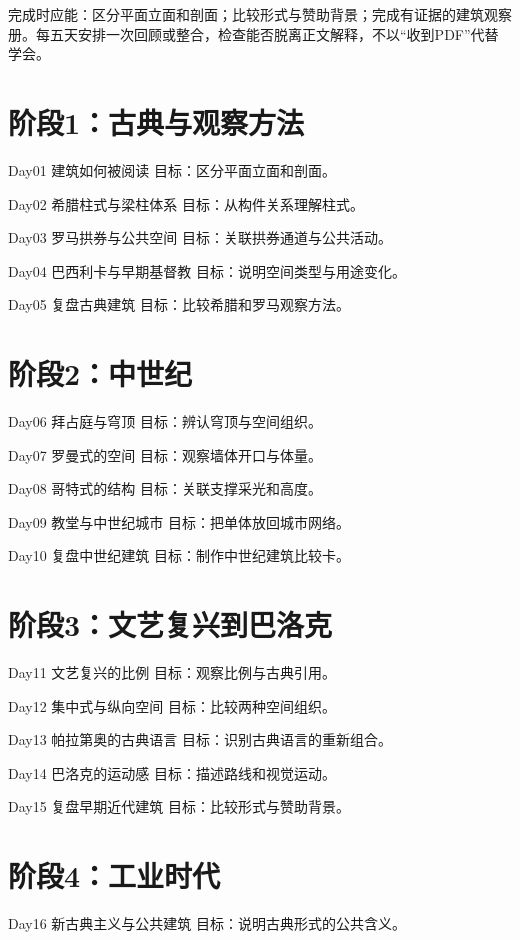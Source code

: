 \documentclass[11pt]{article}
\newcommand{\Needspace}[1]{\par\ifdim\dimexpr\pagegoal-\pagetotal\relax<#1\relax\newpage\fi}
\begin{document}
完成时应能：区分平面立面和剖面；比较形式与赞助背景；完成有证据的建筑观察册。每五天安排一次回顾或整合，检查能否脱离正文解释，不以“收到PDF”代替学会。

\Needspace{5\baselineskip}\section*{阶段1：古典与观察方法}

Day01  建筑如何被阅读
目标：区分平面立面和剖面。

Day02  希腊柱式与梁柱体系
目标：从构件关系理解柱式。

Day03  罗马拱券与公共空间
目标：关联拱券通道与公共活动。

Day04  巴西利卡与早期基督教
目标：说明空间类型与用途变化。

Day05  复盘古典建筑
目标：比较希腊和罗马观察方法。

\Needspace{5\baselineskip}\section*{阶段2：中世纪}

Day06  拜占庭与穹顶
目标：辨认穹顶与空间组织。

Day07  罗曼式的空间
目标：观察墙体开口与体量。

Day08  哥特式的结构
目标：关联支撑采光和高度。

Day09  教堂与中世纪城市
目标：把单体放回城市网络。

Day10  复盘中世纪建筑
目标：制作中世纪建筑比较卡。

\Needspace{5\baselineskip}\section*{阶段3：文艺复兴到巴洛克}

Day11  文艺复兴的比例
目标：观察比例与古典引用。

Day12  集中式与纵向空间
目标：比较两种空间组织。

Day13  帕拉第奥的古典语言
目标：识别古典语言的重新组合。

Day14  巴洛克的运动感
目标：描述路线和视觉运动。

Day15  复盘早期近代建筑
目标：比较形式与赞助背景。

\Needspace{5\baselineskip}\section*{阶段4：工业时代}

Day16  新古典主义与公共建筑
目标：说明古典形式的公共含义。
\end{document}
